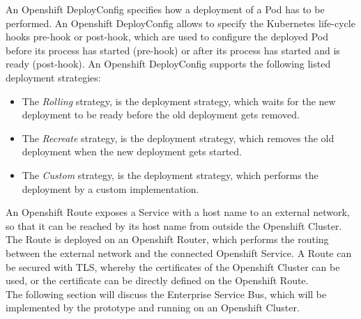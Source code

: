 An Openshift DeployConfig specifies how a deployment of a Pod has to be performed. An Openshift DeployConfig allows to specify the Kubernetes life-cycle hooks pre-hook or post-hook, which are used to configure the deployed Pod before its process has started (pre-hook) or after its process has started and is ready (post-hook). An Openshift DeployConfig supports the following listed deployment strategies\cite{OpenshiftDeployments2018}:
\begin{itemize}
	\item The \emph{Rolling} strategy, is the deployment strategy, which waits for the new deployment to be ready before the old deployment gets removed.
	\item The \emph{Recreate} strategy, is the deployment strategy, which removes the old deployment when the new deployment gets started.
	\item The \emph{Custom} strategy, is the deployment strategy, which performs the deployment by a custom implementation.
\end{itemize}

An Openshift Route exposes a Service with a host name to an external network, so that it can be reached by its host name from outside the Openshift Cluster. The Route is deployed on an Openshift Router, which performs the routing between the external network and the connected Openshift Service. A Route can be secured with TLS, whereby the certificates of the Openshift Cluster can be used, or the certificate can be directly defined on the Openshift Route. \\

The following section will discuss the Enterprise Service Bus, which will be implemented by the prototype and running on an Openshift Cluster.
